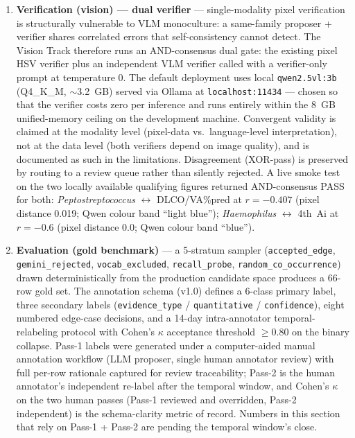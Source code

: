 \documentclass[12pt, letterpaper]{article}
\begin{document}
\begin{enumerate}
    \item \textbf{Verification (vision) --- dual verifier} --- single-modality pixel verification is structurally vulnerable to VLM monoculture: a same-family proposer + verifier shares correlated errors that self-consistency cannot detect. The Vision Track therefore runs an AND-consensus dual gate: the existing pixel HSV verifier plus an independent VLM verifier called with a verifier-only prompt at temperature 0. The default deployment uses local \texttt{qwen2.5vl:3b} (Q4\_K\_M, $\sim$3.2~GB) served via Ollama at \texttt{localhost:11434} --- chosen so that the verifier costs zero per inference and runs entirely within the 8~GB unified-memory ceiling on the development machine. Convergent validity is claimed at the modality level (pixel-data vs.\ language-level interpretation), not at the data level (both verifiers depend on image quality), and is documented as such in the limitations. Disagreement (XOR-pass) is preserved by routing to a review queue rather than silently rejected. A live smoke test on the two locally available qualifying figures returned AND-consensus PASS for both: \textit{Peptostreptococcus} $\leftrightarrow$ DLCO/VA\%pred at $r=-0.407$ (pixel distance 0.019; Qwen colour band ``light blue''); \textit{Haemophilus} $\leftrightarrow$ 4th~Ai at $r=-0.6$ (pixel distance 0.0; Qwen colour band ``blue'').
    \item \textbf{Evaluation (gold benchmark)} --- a 5-stratum sampler (\texttt{accepted\_edge}, \texttt{gemini\_rejected}, \texttt{vocab\_excluded}, \texttt{recall\_probe}, \texttt{random\_co\_occurrence}) drawn deterministically from the production candidate space produces a 66-row gold set. The annotation schema (v1.0) defines a 6-class primary label, three secondary labels (\texttt{evidence\_type} / \texttt{quantitative} / \texttt{confidence}), eight numbered edge-case decisions, and a 14-day intra-annotator temporal-relabeling protocol with Cohen's $\kappa$ acceptance threshold $\geq 0.80$ on the binary collapse. Pass-1 labels were generated under a computer-aided manual annotation workflow (LLM proposer, single human annotator review) with full per-row rationale captured for review traceability; Pass-2 is the human annotator's independent re-label after the temporal window, and Cohen's $\kappa$ on the two human passes (Pass-1 reviewed and overridden, Pass-2 independent) is the schema-clarity metric of record. Numbers in this section that rely on Pass-1 + Pass-2 are pending the temporal window's close.
\end{enumerate}
\end{document}
